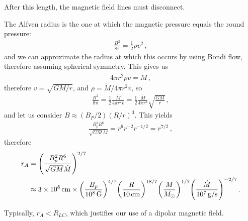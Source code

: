 \documentclass[main.tex]{subfiles}
\begin{document}
After this length, the magnetic field lines must disconnect. 

The Alfven radius is the one at which the magnetic pressure equals the round pressure: 
%
\begin{align}
\frac{B^2}{8 \pi } = \frac{1}{2} \rho v^2
\,,
\end{align}
%
and we can approximate the radius at which this occurs by using Bondi flow, therefore assuming spherical symmetry. 
This gives us 
%
\begin{align}
4 \pi r^2\rho v = \dot{M}
\,,
\end{align}
%
therefore \(v = \sqrt{GM /r}\), and \(\rho = \dot{M} / 4 \pi r^2 v \), so 
%
\begin{align}
\frac{B^2}{8 \pi } = \frac{1}{2} \frac{\dot{M}}{4 \pi r^2v}
= \frac{1}{2} \frac{\dot{M}}{4 \pi r^2} \sqrt{ \frac{GM}{r}}
\,,
\end{align}
%
and let us consider \(B \approx (B_P /2) (R / r)^3\). 
This yields 
%
\begin{align}
\frac{B_p^2 R^{6}}{\sqrt{GM} \dot{M}} = r^{6} r^{-2} r^{-1/2} = r^{7/2}
\,,
\end{align}
%
therefore 
%
\begin{align}
r_A &= \qty(\frac{B_p^2 R^{6}}{\sqrt{GM} \dot{M}})^{2/7}  \\
&\approx \SI{3e8}{cm} \times \qty(\frac{B_p}{\SI{e8}{G}})^{4/7}
\qty(\frac{R}{\SI{10}{cm}})^{18/7} \qty(\frac{M}{M_{\odot}})^{1/7} 
\qty(\frac{\dot{M}}{\SI{e7}{g/s}})^{-2/7}
\,.
\end{align}

Typically, \(r_A < R_{LC}\), which justifies our use of a dipolar magnetic field. 
\end{document}
